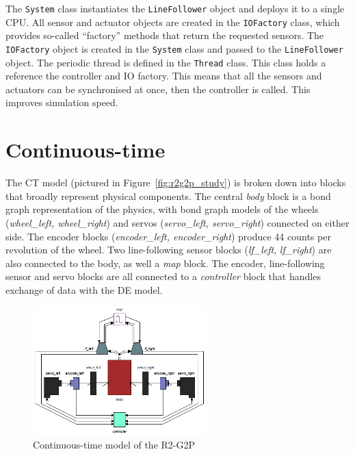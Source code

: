 The \texttt{System} class instantiates the
\texttt{LineFollower} object and deploys it to a single CPU. All sensor and actuator objects are created in the \texttt{IOFactory} class, which provides so-called ``factory'' methods that return the requested sensors. The \texttt{IOFactory} object is created in the \texttt{System} class and passed to the \texttt{LineFollower} object. The periodic thread is defined in the \texttt{Thread} class. This class holds a reference the controller and IO factory. This means that all the sensors and actuators can be synchronised at once, then the controller is called. This improves simulation speed.



\section{Continuous-time}

The CT model (pictured in Figure~\ref{fig:r2g2p_study}) is broken down into blocks that broadly represent physical components. The central \emph{body} block is a bond graph representation of the physics, with bond graph models of the wheels (\emph{wheel\_left, wheel\_right}) and servos (\emph{servo\_left, servo\_right}) connected on either side. The encoder blocks (\emph{encoder\_left, encoder\_right}) produce 44 counts per revolution of the wheel. Two line-following sensor blocks (\emph{lf\_left}, \emph{lf\_right}) are also connected to the body, as well a \emph{map} block. The encoder, line-following sensor and servo blocks are all connected to a \emph{controller} block that handles exchange of data with the DE model.

\begin{figure}[htb!]
\begin{center}
\includegraphics[width=0.6\textwidth]{lineFollowingRobot/r2g2p_ct}
\end{center}
\caption{Continuous-time model of the R2-G2P}
\label{fig:r2g2p_studyCT}
\end{figure}


